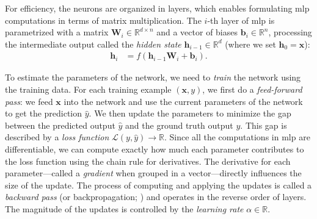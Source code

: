 For efficiency, the neurons are organized in layers, which enables formulating \ac{mlp} computations in terms of matrix multiplication. The $i$-th layer of \ac{mlp} is parametrized with a matrix $\mathbf{W}_i \in \mathbb{R}^{d\times n}$ and a vector of biases $\mathbf{b}_i \in \mathbb{R}^{n}$, processing the intermediate output called the \textit{hidden state} $\mathbf{h}_{i-1} \in \mathbb{R}^{d}$ (where we set $\textbf{h}_0 = \textbf{x}$):
\begin{align}
    \mathbf{h}_i & = f(\mathbf{h}_{i-1} \mathbf{W}_i + \mathbf{b}_i).
\end{align}

To estimate the parameters of the network, we need to \emph{train} the network using the training data. For each training example $(\mathbf{x}, y)$, we first do a \emph{feed-forward pass}: we feed $\mathbf{x}$ into the network and use the current parameters of the network to get the prediction $\hat{y}$. We then update the parameters to minimize the gap between the predicted output $\hat{y}$ and the ground truth output $y$. This gap is described by a \textit{loss function} $\mathcal{L}(y, \hat{y}) \rightarrow \mathbb{R}$.
Since all the computations in \ac{mlp} are differentiable, we can compute exactly how much each parameter contributes to the loss function using the chain rule for derivatives. The derivative for each parameter---called a \emph{gradient} when grouped in a vector---directly influences the size of the update. The process of computing and applying the updates is called a \emph{backward pass} (or backpropagation; \citealp{kelley1960gradient,rumelhart1986learning}) and operates in the reverse order of layers. The magnitude of the updates is controlled by the \emph{learning rate} $\alpha \in \mathbb{R}$.

